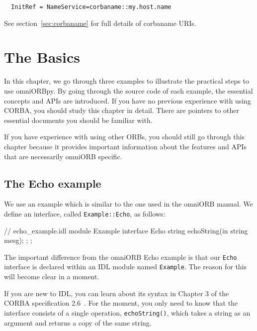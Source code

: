 \documentclass[11pt,oneside,a4paper]{book}
\newcommand{\intf}[1]{\texttt{#1}}
\newcommand{\module}[1]{\texttt{#1}}
\newcommand{\op}[1]{\texttt{#1()}}
\begin{document}
\begin{verbatim}
  InitRef = NameService=corbaname::my.host.name
\end{verbatim}

See section~\ref{sec:corbaname} for full details of corbaname URIs.



\chapter{The Basics}
\label{chap:basics}

In this chapter, we go through three examples to illustrate the
practical steps to use omniORBpy. By going through the source code of
each example, the essential concepts and APIs are introduced. If you
have no previous experience with using CORBA, you should study this
chapter in detail. There are pointers to other essential documents you
should be familiar with.

If you have experience with using other ORBs, you should still go
through this chapter because it provides important information about
the features and APIs that are necessarily omniORB specific.


\section{The Echo example}

We use an example which is similar to the one used in the omniORB
manual. We define an interface, called \intf{Example::Echo}, as
follows:

\begin{idllisting}
// echo_example.idl
module Example {
  interface Echo {
    string echoString(in string mesg);
  };
};
\end{idllisting}

The important difference from the omniORB Echo example is that our
\intf{Echo} interface is declared within an IDL module named
\module{Example}. The reason for this will become clear in a moment.

If you are new to IDL, you can learn about its syntax in Chapter 3 of
the CORBA specification 2.6~\cite{corba26-spec}. For the moment, you
only need to know that the interface consists of a single operation,
\op{echoString}, which takes a string as an argument and returns a
copy of the same string.
\end{document}
